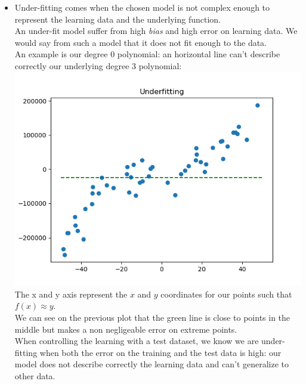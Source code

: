 \documentclass[a4paper, 10pt]{article}
\begin{document}
\begin{itemize}[label=$\square$]
    \item Under-fitting comes when the chosen model is not complex enough
    to represent the learning data and the underlying function. 
    \\
    An under-fit model suffer from high \emph{bias} and high error on learning data.    
    We would say from such a model that it does not fit enough to the data.
    \\
    An example is our degree 0 polynomial: an horizontal line can't describe 
    correctly our underlying degree 3 polynomial:
    \\
    \includegraphics[scale=0.7]{ex1a_under}
    \\
    The x and y axis represent the $x$ and $y$ coordinates for our points such that
    $f(x) \approx y$.
    \\
    We can see on the previous plot that the green line is close to points in the 
    middle but makes a non negligeable error on extreme points.
    \\
    When controlling the learning with a test dataset, we know we are under-fitting when
    both the error on the training and the test data is high: our model does not describe 
    correctly the learning data and can't generalize to other data.
    

\end{itemize}
\end{document}
